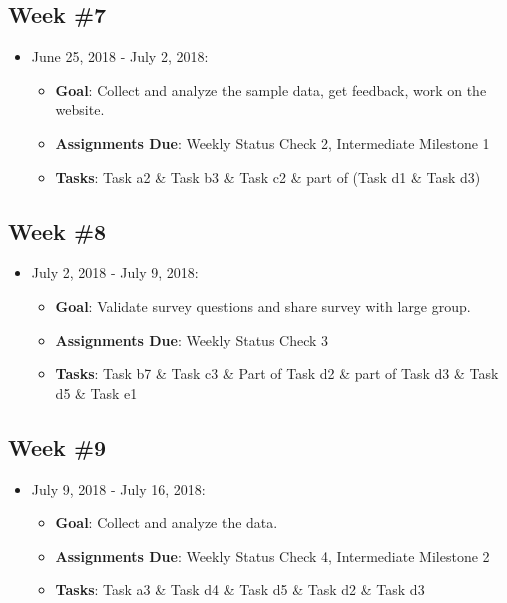 \documentclass{sigchi}
\begin{document}
 \subsection{Week \#7}
\begin{itemize}
 	\item June 25, 2018 - July 2, 2018:
	\begin{itemize}
 		\item \textbf{Goal}: Collect and analyze the sample data, get feedback, work on the website.
 		\item \textbf{Assignments Due}: Weekly Status Check 2, Intermediate Milestone 1
 		\item \textbf{Tasks}: Task a2 \& Task b3 \& Task c2  \& part of (Task d1 \& Task d3)
 	\end{itemize} 
\end{itemize}
 
 \subsection{Week \#8}
\begin{itemize}
 	\item July 2, 2018 - July 9, 2018:
	\begin{itemize}
 		\item \textbf{Goal}: Validate survey questions and share survey with large group.
 		\item \textbf{Assignments Due}: Weekly Status Check 3
 		\item \textbf{Tasks}: Task b7 \& Task c3 \& Part of Task d2 \& part of Task d3 \& Task d5 \& Task e1 
	\end{itemize} 
 \end{itemize} 
 
 \subsection{Week \#9}
\begin{itemize}
 	\item July 9, 2018 - July 16, 2018:
	\begin{itemize}
	 	\item \textbf{Goal}: Collect and analyze the data.
 		\item \textbf{Assignments Due}: Weekly Status Check 4, Intermediate Milestone 2
 		\item \textbf{Tasks}: Task a3 \& Task d4 \& Task d5 \& Task d2 \& Task d3 
	\end{itemize} 
 \end{itemize} 
 
\end{document}
